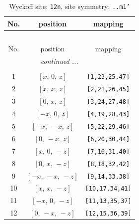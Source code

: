 \documentclass[fleqn,8pt]{jsarticle}
\begin{document}
\begin{longtable}{ccc}
\caption{Wyckoff site: {\tt 12n}, site symmetry: {\tt ..m1'}}
 \\
 \hline \hline
No. & position & mapping \\ \hline \endfirsthead

\multicolumn{2}{l}{\tablename\ \thetable{}} \\
 \hline \hline
No. & position & mapping \\ \hline \endhead

 \hline \hline
\multicolumn{2}{r}{\footnotesize\it continued ...} \\ \endfoot

 \hline \hline
\multicolumn{2}{r}{} \\ \endlastfoot

1 & $\left[ x,\, 0,\, z \right]$ & {\tt [1,23,25,47]} \\ \hline
2 & $\left[ x,\, x,\, z \right]$ & {\tt [2,21,26,45]} \\ \hline
3 & $\left[ 0,\, x,\, z \right]$ & {\tt [3,24,27,48]} \\ \hline
4 & $\left[ - x,\, 0,\, z \right]$ & {\tt [4,19,28,43]} \\ \hline
5 & $\left[ - x,\, - x,\, z \right]$ & {\tt [5,22,29,46]} \\ \hline
6 & $\left[ 0,\, - x,\, z \right]$ & {\tt [6,20,30,44]} \\ \hline
7 & $\left[ x,\, 0,\, - z \right]$ & {\tt [7,16,31,40]} \\ \hline
8 & $\left[ 0,\, x,\, - z \right]$ & {\tt [8,18,32,42]} \\ \hline
9 & $\left[ - x,\, - x,\, - z \right]$ & {\tt [9,14,33,38]} \\ \hline
10 & $\left[ x,\, x,\, - z \right]$ & {\tt [10,17,34,41]} \\ \hline
11 & $\left[ - x,\, 0,\, - z \right]$ & {\tt [11,13,35,37]} \\ \hline
12 & $\left[ 0,\, - x,\, - z \right]$ & {\tt [12,15,36,39]} \\
\end{longtable}
\renewcommand{\arraystretch}{1.2}
\end{document}

